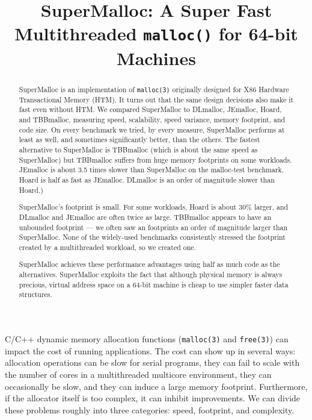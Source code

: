 \documentclass[pldi]{sigplanconf-pldi15}
\def\code{\lstinline[basicstyle=\ttfamily]}
\begin{document}
\title{SuperMalloc: A Super Fast Multithreaded \texttt{malloc()} for 64-bit Machines}
\date{}
\maketitle
\begin{abstract}
SuperMalloc is an implementation of \texttt{malloc(3)} originally
designed for X86 Hardware Transactional Memory (HTM)\@.  It turns out
that the same design decisions also make it fast even without HTM\@.
We compared SuperMalloc to DLmalloc, JEmalloc, Hoard, and TBBmalloc,
measuring speed, scalability, speed variance, memory footprint, and
code size.  On every benchmark we tried, by every measure, SuperMalloc
performs at least as well, and sometimes significantly better, than the
others.  The fastest alternative to SuperMalloc is TBBmalloc (which is
about the same speed as SuperMalloc) but TBBmalloc suffers from huge
memory footprints on some workloads.  JEmalloc is about 3.5 times
slower than SuperMalloc on the malloc-test benchmark.  Hoard is half
as fast as JEmalloc. DLmalloc is an order of magnitude slower than
Hoard.)

SuperMalloc's footprint is small.  For some workloads, Hoard is about
30\% larger, and DLmalloc and JEmalloc are often twice as large.
TBBmalloc appears to have an unbounded footprint --- we often saw an
footprints an order of magnitude larger than SuperMalloc.  None of the
widely-used benchmarks consistently stressed the footprint created by
a multithreaded workload, so we created one.

SuperMalloc achieves these performance advantages using half as much
code as the alternatives.  SuperMalloc exploits the fact that although
physical memory is always precious, virtual address space on a 64-bit
machine is cheap to use simpler faster data structures.
\end{abstract}


C/C++ dynamic memory allocation functions (\code{malloc(3)} and
\code{free(3)}) can impact the cost of running applications.  The cost
can show up in several ways: allocation operations can be slow for
serial programs, they can fail to scale with the number of cores in a
multithreaded multicore environment, they can occasionally be slow,
and they can induce a large memory footprint.  Furthermore, if the
allocator itself is too complex, it can inhibit improvements.  We can
divide these problems roughly into three categories: speed, footprint,
and complexity. 
\end{document}
